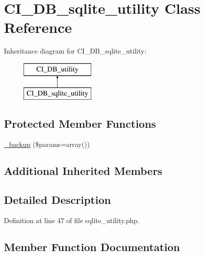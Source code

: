\hypertarget{class_c_i___d_b__sqlite__utility}{}\section{C\+I\+\_\+\+D\+B\+\_\+sqlite\+\_\+utility Class Reference}
\label{class_c_i___d_b__sqlite__utility}
Inheritance diagram for C\+I\+\_\+\+D\+B\+\_\+sqlite\+\_\+utility\+:\begin{figure}[H]
\begin{center}
\leavevmode
\includegraphics[height=2.000000cm]{class_c_i___d_b__sqlite__utility}
\end{center}
\end{figure}
\subsection*{Protected Member Functions}
\begin{DoxyCompactItemize}
\item 
\mbox{\hyperlink{class_c_i___d_b__sqlite__utility_a30f3053d2c82e7562349924363507afa}{\+\_\+backup}} (\$params=array())
\end{DoxyCompactItemize}
\subsection*{Additional Inherited Members}


\subsection{Detailed Description}


Definition at line 47 of file sqlite\+\_\+utility.\+php.



\subsection{Member Function Documentation}
\mbox{\label{class_c_i___d_b__sqlite__utility_a30f3053d2c82e7562349924363507afa}} 
